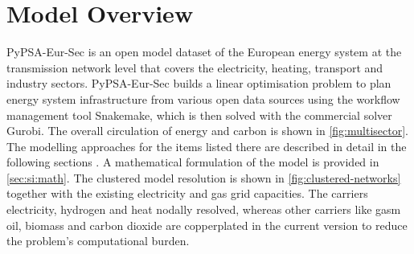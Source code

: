 \section{Model Overview}
\label{sec:si:model-overview}


PyPSA-Eur-Sec is an open model dataset of the European energy system at the
transmission network level that covers the electricity, heating, transport and
industry sectors. PyPSA-Eur-Sec builds a linear optimisation problem to plan
energy system infrastructure from various open data sources using the workflow
management tool Snakemake, which is then solved with the
commercial solver Gurobi. The overall circulation of energy and
carbon is shown in \cref{fig:multisector}. The modelling approaches for the
items listed there are described in detail in the following sections
. A mathematical
formulation of the model is provided in \cref{sec:si:math}. The clustered model
resolution is shown in \cref{fig:clustered-networks} together with the existing
electricity and gas grid capacities. The carriers electricity, hydrogen and heat
nodally resolved, whereas other carriers like gasm oil, biomass and carbon
dioxide are copperplated in the current version to reduce the problem's
computational burden.
